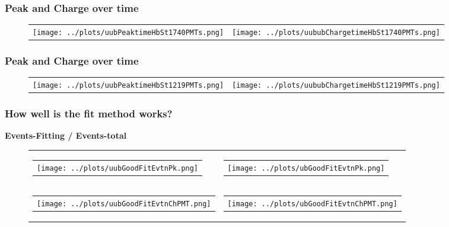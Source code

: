 \documentclass[aspectratio=169]{beamer}
\begin{document}
\begin{frame}
	\frametitle{Peak and Charge over time}
  \begin{figure}
  \centering
    \begin{tabularx}{\textwidth}{CC}
      \texttt{[image: ../plots/uubPeaktimeHbSt1740PMTs.png]}
      &
      \texttt{[image: ../plots/uububChargetimeHbSt1740PMTs.png]}
    \end{tabularx}
  \end{figure}
\end{frame}


\begin{frame}
	\frametitle{Peak and Charge over time}
  \begin{figure}
  \centering
    \begin{tabularx}{\textwidth}{CC}
      \texttt{[image: ../plots/uubPeaktimeHbSt1219PMTs.png]}
      &
      \texttt{[image: ../plots/uububChargetimeHbSt1219PMTs.png]}
    \end{tabularx}
  \end{figure}
\end{frame}


\begin{frame}
  \frametitle{How well is the fit method works? }
  {\bf Events-Fitting / Events-total }
	\begin{figure}
		\centering
    \begin{tabularx}{\textwidth}{CC}
      \begin{tabular}{l}
        \texttt{[image: ../plots/uubGoodFitEvtnPk.png]}
      \end{tabular}
      &
			\begin{tabular}{l}
				\texttt{[image: ../plots/ubGoodFitEvtnPk.png]}
			\end{tabular}
			\\
			\begin{tabular}{l}
				\texttt{[image: ../plots/uubGoodFitEvtnChPMT.png]}
			\end{tabular} 
      &
      \begin{tabular}{l}
        \texttt{[image: ../plots/ubGoodFitEvtnChPMT.png]}
      \end{tabular}
		\end{tabularx}
	\end{figure}
\end{frame}
\end{document}

